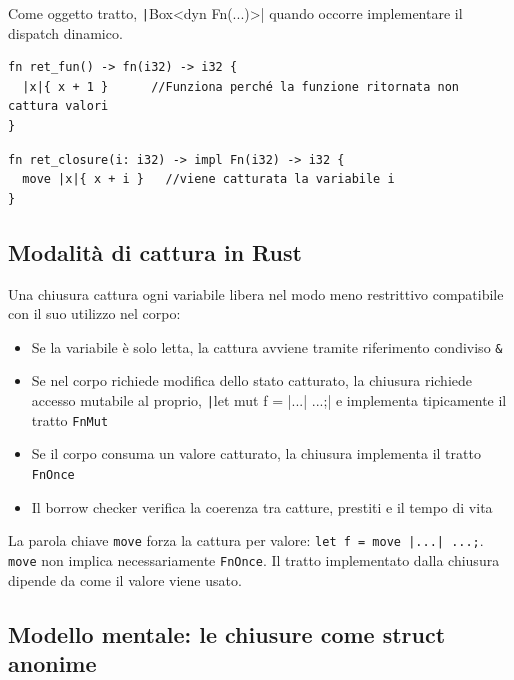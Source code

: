 Come oggetto tratto, \texttt|Box<dyn Fn(...)>| quando occorre implementare
il dispatch dinamico.

\begin{center}
  \begin{minipage}{0.37\linewidth}
    \begin{verbatim}
fn ret_fun() -> fn(i32) -> i32 {
  |x|{ x + 1 }      //Funziona perché la funzione ritornata non cattura valori
}
\end{verbatim}
  \end{minipage}%
  \hfill
  \begin{minipage}{0.57\linewidth}
    \begin{verbatim}
fn ret_closure(i: i32) -> impl Fn(i32) -> i32 {
  move |x|{ x + i }   //viene catturata la variabile i
}
\end{verbatim}
  \end{minipage}
\end{center}


\subsection{Modalità di cattura in Rust}
Una chiusura cattura ogni variabile libera nel modo meno restrittivo compatibile
con il suo utilizzo nel corpo:

\begin{itemize}
  \item Se la variabile è solo letta, la cattura avviene tramite riferimento condiviso \verb|&|
  \item Se nel corpo richiede modifica dello stato catturato, la chiusura
        richiede accesso mutabile al proprio, \texttt|let mut f = |...| {...};|
        e implementa tipicamente il tratto \verb|FnMut|
  \item Se il corpo consuma un valore catturato, la chiusura implementa il tratto \verb|FnOnce|
  \item Il borrow checker verifica la coerenza tra catture, prestiti e il
        tempo di vita
\end{itemize}

La parola chiave \verb|move| forza la cattura per valore: \texttt{let f = move |...| {...};}.
\verb|move| non implica necessariamente \verb|FnOnce|.
Il tratto implementato dalla chiusura dipende da come il valore viene usato.

\subsection{Modello mentale: le chiusure come struct anonime}

